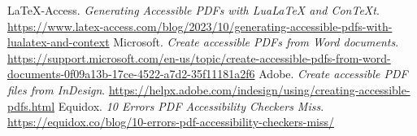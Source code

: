 \begin{thebibliography}{99}
 LaTeX-Access. \textit{Generating Accessible PDFs with LuaLaTeX and ConTeXt}. \url{https://www.latex-access.com/blog/2023/10/generating-accessible-pdfs-with-lualatex-and-context}
 Microsoft. \textit{Create accessible PDFs from Word documents}. \url{https://support.microsoft.com/en-us/topic/create-accessible-pdfs-from-word-documents-0f09a13b-17ce-4522-a7d2-35f11181a2f6}
 Adobe. \textit{Create accessible PDF files from InDesign}. \url{https://helpx.adobe.com/indesign/using/creating-accessible-pdfs.html}
 Equidox. \textit{10 Errors PDF Accessibility Checkers Miss}. \url{https://equidox.co/blog/10-errors-pdf-accessibility-checkers-miss/}
\end{thebibliography}
